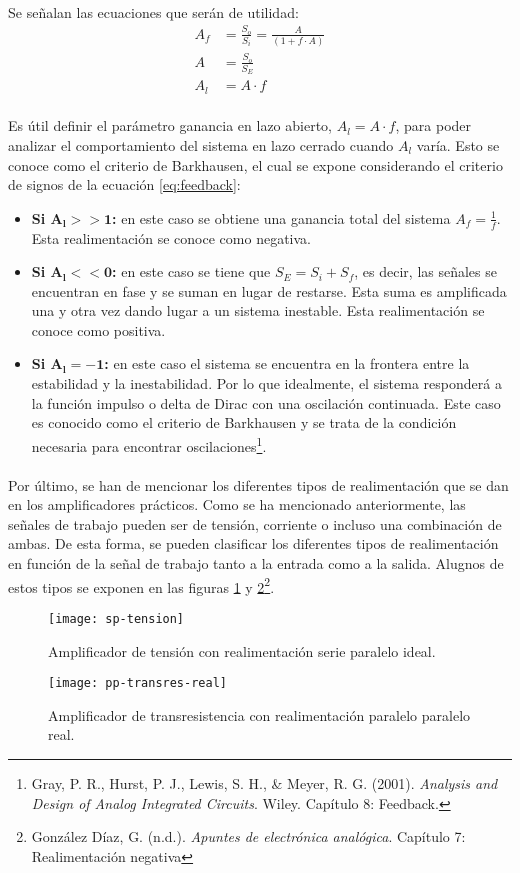 \paragraph{}
Se señalan las ecuaciones que ser\'an de utilidad:
\begin{align}
   \label{eq:feedback}
   A_f &= \frac{S_o}{S_i} = \frac{A}{(1 + f \cdot A)} \\
   \label{eq:A}
   A &= \frac{S_o}{S_E} \\
   \label{eq:Al}
   A_l &= A \cdot f
\end{align}
\paragraph{}
Es útil definir el par\'ametro ganancia en lazo abierto, $A_l = A \cdot f$, para poder analizar el comportamiento del sistema en lazo cerrado cuando $A_l$ var\'ia. Esto se conoce como el criterio de Barkhausen, el cual se expone considerando el criterio de signos de la ecuaci\'on \ref{eq:feedback}:
\begin{itemize}
   \item \textbf{Si $\mathbf {A_l >> 1}$:} en este caso se obtiene una ganancia total del sistema $A_f = \frac{1}{f}$. Esta realimentación se conoce como negativa.
   \item \textbf{Si $\mathbf{A_l << 0}$:} en este caso se tiene que $S_E = S_i + S_f$, es decir, las señales se encuentran en fase y se suman en lugar de restarse. Esta suma es amplificada una y otra vez dando lugar a un sistema inestable. Esta realimentación se conoce como positiva.
   \item \textbf{Si $\mathbf{A_l = -1}$:} en este caso el sistema se encuentra en la frontera entre la estabilidad y la inestabilidad. Por lo que idealmente, el sistema responder\'a a la funci\'on impulso o delta de Dirac con una oscilaci\'on continuada. Este caso es conocido como el criterio de Barkhausen y se trata de la condici\'on necesaria para encontrar oscilaciones\footnote{Gray, P. R., Hurst, P. J., Lewis, S. H., \& Meyer, R. G. (2001). \textit{Analysis and Design of Analog Integrated Circuits}. Wiley. Capítulo 8: Feedback.}.
\end{itemize}
\paragraph{}
Por último, se han de mencionar los diferentes tipos de realimentación que se dan en los amplificadores prácticos. Como se ha mencionado anteriormente, las señales de trabajo pueden ser de tensión, corriente o incluso una combinación de ambas. De esta forma, se pueden clasificar los diferentes tipos de realimentación en función de la señal de trabajo tanto a la entrada como a la salida. Alugnos de estos tipos se exponen en las figuras \ref{fig:sp} y \ref{fig:pp}\footnote{González Díaz, G. (n.d.). \textit{Apuntes de electrónica analógica}. Cap\'itulo 7: Realimentaci\'on negativa}.
\begin{figure}[H]
    \centering
    \texttt{[image: sp-tension]}
    \caption{Amplificador de tensión con realimentaci\'on serie paralelo ideal.} 
    \label{fig:sp}
\end{figure}

\begin{figure}[H]
    \centering
    \texttt{[image: pp-transres-real]}
    \caption{Amplificador de transresistencia con realimentación paralelo paralelo real.} 
    \label{fig:pp}
\end{figure}
